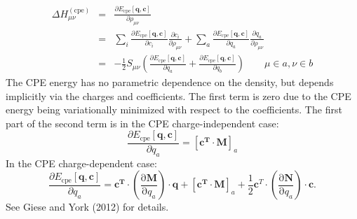 \documentclass{article}
\numberwithin{equation}{section}
\begin{document}
\begin{eqnarray}
    \Delta H_{\mu\nu}^{\mathrm{(cpe)}} &=& \frac{\partial E_{\mathrm{cpe}}\left[\mathbf{q}, \mathbf{c}\right]}{\partial \rho_{\mu\nu}}\\
    &=& \sum_i \frac{\partial E_{\mathrm{cpe}}\left[\mathbf{q}, \mathbf{c}\right]}{\partial c_i} 
    \frac{\partial c_i}{\partial \rho_{\mu\nu}}
    + \sum_a \frac{\partial E_{\mathrm{cpe}}\left[\mathbf{q}, \mathbf{c}\right]}{\partial q_a} 
    \frac{\partial q_a}{\partial \rho_{\mu\nu}}\\
    &=& - \frac{1}{2} S_{\mu\nu} \left(
    \frac{\partial E_{\mathrm{cpe}}\left[\mathbf{q}, \mathbf{c}\right]}{\partial q_a} +
    \frac{\partial E_{\mathrm{cpe}}\left[\mathbf{q}, \mathbf{c}\right]}{\partial q_b}
\right) \qquad \mu \in a, \nu \in b
\end{eqnarray}
The CPE energy has no parametric dependence on the density, but depends implicitly via the charges and coefficients.
The first term is zero due to the CPE energy being variationally minimized with respect to the coefficients.
The first part of the second term is in the CPE charge-independent case:
\begin{equation}
    \frac{\partial E_{\mathrm{cpe}}\left[\mathbf{q}, \mathbf{c}\right]}{\partial q_a} = [\mathbf{c^T}  \cdot \mathbf{M}]_a
\end{equation}
In the CPE charge-dependent case:
\begin{equation}
    \frac{\partial E_{\mathrm{cpe}}\left[\mathbf{q}, \mathbf{c}\right]}{\partial q_a} = 
    \mathbf{c^T} \cdot \left( \frac{\mathrm{\partial}\mathbf{M}}{\mathrm{\partial}q_a}\right) \cdot \mathbf{q} 
    + [\mathbf{c^T}  \cdot \mathbf{M}]_a + \frac{1}{2}\mathbf{c}^T \cdot \left( \frac{\mathrm{\partial}\mathbf{N}}{\mathrm{\partial}q_a}\right) \cdot \mathbf{c}. 
\end{equation}
See Giese and York (2012) for details.\cite{gieseyork2012}
\end{document}
